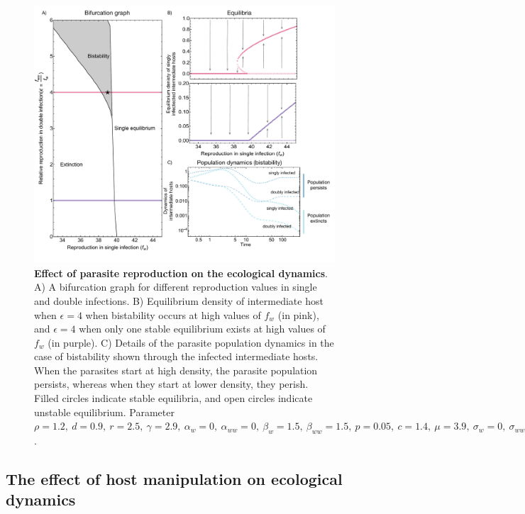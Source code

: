 \documentclass[a4paper]{scrartcl}
\begin{document}
\begin{figure}[!ht]
\captionsetup{format=plain}
\includegraphics[width = \textwidth]{reproduction_bifurcation2.pdf}
\caption{\textbf{Effect of parasite reproduction on the ecological dynamics}. 
A) A bifurcation graph for different reproduction values in single and double infections. 
B) Equilibrium density of intermediate host when $\epsilon = 4$ when bistability occurs at high values of $f_w$ (in pink), and $\epsilon = 4$ when only one stable equilibrium exists at high values of $f_w$ (in purple). 
C) Details of the parasite population dynamics in the case of bistability shown through the infected intermediate hosts. 
When the parasites start at high density, the parasite population persists, whereas when they start at lower density, they perish.
Filled circles indicate stable equilibria, and open circles indicate unstable equilibrium. Parameter $\rho = 1.2, \  d = 0.9, \  r = 2.5, \ \gamma = 2.9, \ \alpha_w = 0, \ \alpha_{ww} =  0, \ \beta_w = 1.5, \ \beta_{ww} = 1.5, \ p = 0.05, \  c = 1.4, \ \mu = 3.9,  \ \sigma_w = 0, \ \sigma_{ww} = 0, \  q = 0.05, \ \delta = 0.9, \ k = 0.26, \ h = 0.6$.
}
\label{fig:bistability}
\end{figure}

\subsection*{The effect of host manipulation on ecological dynamics}
\end{document}
